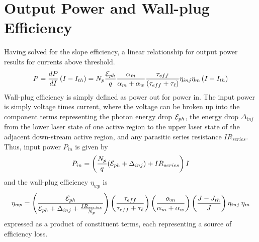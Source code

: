 \documentclass[12pt]{report}
\begin{document}
{%




\section{Output Power and Wall-plug Efficiency}
Having solved for the slope efficiency, a linear relationship for output power results for currents above threshold.
\begin{equation}
P=\frac{d P}{dI} \left( I - I_{th} \right) = N_p \frac{\EE_{ph}}{q} \frac{\alpha_m}{\alpha_m+\alpha_w}   \frac{\tau_{eff}}{\left(\tau_{eff}+\tau_{\ell}\right)} \eta_{inj} \eta_{m}  \left( I - I_{th} \right)
\end{equation}
Wall-plug efficiency is simply defined as power out for power in.  The input power is simply voltage times current, where the voltage can be broken up into the component terms representing the photon energy drop $\EE_{ph}$, the energy drop $\Delta_{inj}$ from the lower laser state of one active region to the upper laser state of the adjacent down-stream active region, and any parasitic series resistance $I R_{series}$.  Thus, input power $P_{in}$ is given by
\begin{equation}
P_{in} = \left( \frac{N_p}{q} (\EE_{ph}+\Delta_{inj})+ I R_{series} \right) I
\end{equation}
and the wall-plug efficiency $\eta_{wp}$ is
\begin{equation}
\eta_{wp}=
\Biggl( \frac{\EE_{ph}}{\EE_{ph}+\Delta_{inj}+\frac{I R_{series}}{N_p}} \Biggr)
\left(\frac{\tau_{eff}}{\tau_{eff}+\tau_\ell} \right)
\left(\frac{\alpha_m}{\alpha_m + \alpha_w} \right)
\left(\frac{J-J_{th}}{J}  \right)
\eta_{inj} \: \eta_m
\end{equation}
expressed as a product of constituent terms, each representing a source of efficiency loss.


}
\end{document}
